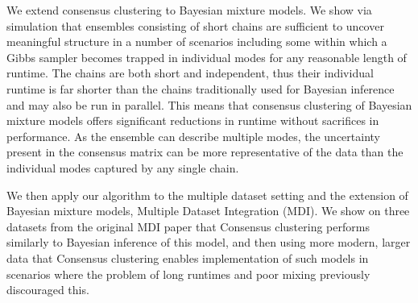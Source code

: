\documentclass{bioinfo}
\begin{document}
We extend consensus clustering to Bayesian mixture models. We show via simulation that ensembles consisting of short chains are sufficient to uncover meaningful structure in a number of scenarios including some within which a Gibbs sampler becomes trapped in individual modes for any reasonable length of runtime. The chains are both short and independent, thus their individual runtime is far shorter than the chains traditionally used for Bayesian inference and may also be run in parallel. This means that consensus clustering of Bayesian mixture models offers significant reductions in runtime without sacrifices in performance. As the ensemble can describe multiple modes, the uncertainty present in the consensus matrix can be more representative of the data than the individual modes captured by any single chain.

 We then apply our algorithm to the multiple dataset setting and the extension of Bayesian mixture models, Multiple Dataset Integration (MDI). We show on three datasets from the original MDI paper that Consensus clustering performs similarly to Bayesian inference of this model, and then using more modern, larger data that Consensus clustering enables implementation of such models in scenarios where the problem of long runtimes and poor mixing previously discouraged this. 

\end{document}
